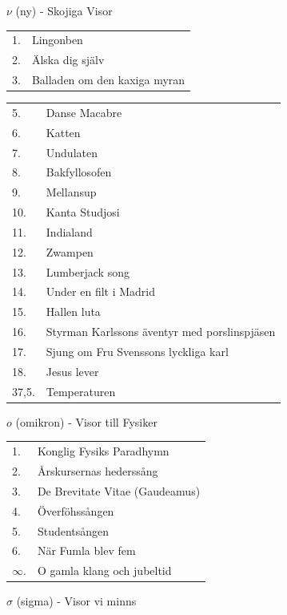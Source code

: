 \documentclass[a6paper,10pt]{article}
\begin{document}
\vspace{5pt}

\noindent \Large $\nu$ (ny) - Skojiga Visor

\noindent
\normalsize
\begin{tabularx}{1\textwidth}{l X}
1.&Lingonben\\
2.&Älska dig själv\\
3.&Balladen om den kaxiga myran\\
\end{tabularx}

\noindent
\begin{tabularx}{1\textwidth}{l X}
5.&Danse Macabre\\
6.&Katten \\
7.&Undulaten \\
8.&Bakfyllosofen\\
9.&Mellansup\\
10.&Kanta Studjosi\\
11.&Indialand\\
12.&Zwampen\\
13.&Lumberjack song\\
14.&Under en filt i Madrid\\
15.&Hallen luta\\
16.&Styrman Karlssons äventyr med porslinspjäsen\\
17.&Sjung om Fru Svenssons lyckliga karl\\
18.&Jesus lever\\
37,5.&Temperaturen
\end{tabularx}

\vspace{5pt}

\noindent \Large $o$ (omikron) - Visor till Fysiker

\noindent
\normalsize
\begin{tabularx}{1\textwidth}{l X}
1.&Konglig Fysiks Paradhymn\\
2.&Årskursernas hederssång\\
3.&De Brevitate Vitae (Gaudeamus)\\
4.&Överföhssången\\
5.&Studentsången\\
6.&När Fumla blev fem\\
$\infty$.&O gamla klang och jubeltid
\end{tabularx}

\vspace{5pt}

\noindent \Large $\sigma$ (sigma) - Visor vi minns
\end{document}

